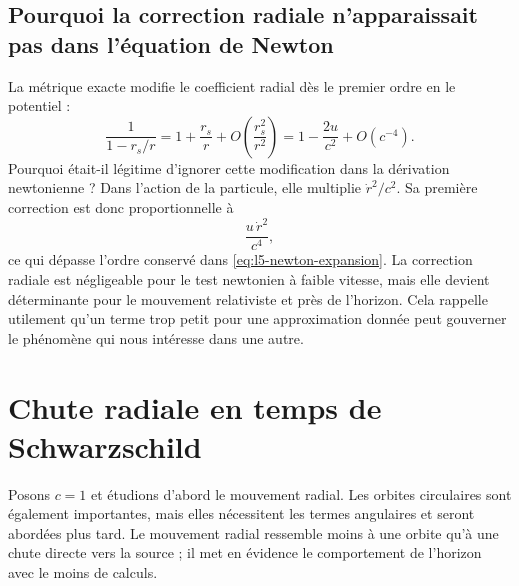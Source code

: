 \subsection{Pourquoi la correction radiale n’apparaissait pas dans l’équation de Newton}

La métrique exacte modifie le coefficient radial dès le premier ordre en le potentiel :
\begin{equation}
\frac{1}{1-r_s/r}
=1+\frac{r_s}{r}
+O\!\left(\frac{r_s^2}{r^2}\right)
=1-\frac{2u}{c^2}+O(c^{-4}).
\label{eq:l5-radial-expansion}
\end{equation}
Pourquoi était-il légitime d’ignorer cette modification dans la dérivation newtonienne ? Dans l’action de la particule, elle multiplie \(\dot r^2/c^2\). Sa première correction est donc proportionnelle à
\begin{equation}
\frac{u\,\dot r^2}{c^4},
\end{equation}
ce qui dépasse l’ordre conservé dans \eqref{eq:l5-newton-expansion}. La correction radiale est négligeable pour le test newtonien à faible vitesse, mais elle devient déterminante pour le mouvement relativiste et près de l’horizon. Cela rappelle utilement qu’un terme trop petit pour une approximation donnée peut gouverner le phénomène qui nous intéresse dans une autre.

\section{Chute radiale en temps de Schwarzschild}

Posons \(c=1\) et étudions d’abord le mouvement radial. Les orbites circulaires sont également importantes, mais elles nécessitent les termes angulaires et seront abordées plus tard. Le mouvement radial ressemble moins à une orbite qu’à une chute directe vers la source ; il met en évidence le comportement de l’horizon avec le moins de calculs.

\begin{classroomqa}
\end{classroomqa}


